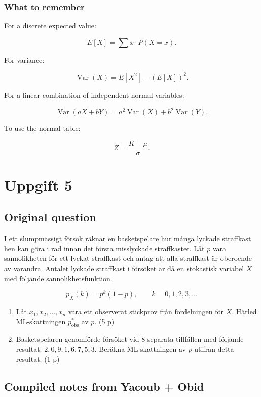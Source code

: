 \documentclass[10pt]{article}
\begin{document}
\subsubsection*{What to remember}
For a discrete expected value:

\[
E[X]=
\sum x\cdot P(X=x).
\]

For variance:

\[
\operatorname{Var}(X)
=E[X^2]-(E[X])^2.
\]

For a linear combination of independent normal variables:

\[
\operatorname{Var}(aX+bY)
=a^2\operatorname{Var}(X)
+b^2\operatorname{Var}(Y).
\]

To use the normal table:

\[
Z=\frac{K-\mu}{\sigma}.
\]

\section*{Uppgift 5}

\subsection*{Original question}
I ett slumpmässigt försök räknar en basketspelare hur många lyckade
straffkast hen kan göra i rad innan det första misslyckade
straffkastet. Låt $p$ vara sannolikheten för ett lyckat straffkast
och antag att alla straffkast är oberoende av varandra. Antalet
lyckade straffkast i försöket är då en stokastisk variabel $X$ med
följande sannolikhetsfunktion.

\[
p_X(k)=p^k(1-p),
\qquad
k=0,1,2,3,\ldots
\]

\begin{enumerate}[label=\alph*)]
\item
Låt $x_1,x_2,\ldots,x_n$ vara ett observerat stickprov från
fördelningen för $X$. Härled ML-skattningen
$p^*_{\mathrm{obs}}$ av $p$.
\hfill (5 p)

\item
Basketspelaren genomförde försöket vid 8 separata tillfällen med
följande resultat: $2,0,9,1,6,7,5,3$. Beräkna ML-skattningen av
$p$ utifrån detta resultat.
\hfill (1 p)
\end{enumerate}

\subsection*{Compiled notes from Yacoub + Obid}
\end{document}
